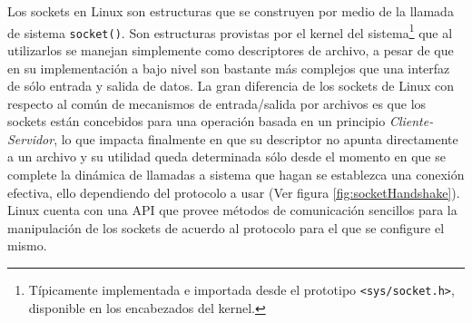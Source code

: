 Los sockets en Linux \cite{rfc:147, book:sockets, paper:socketsGeneral} son estructuras que se construyen por medio de la llamada de sistema \verb=socket()=. Son estructuras provistas por el kernel del sistema\footnote{Típicamente implementada e importada desde el prototipo \verb=<sys/socket.h>=, disponible en los encabezados del kernel.} que al utilizarlos se manejan simplemente como descriptores de archivo, a pesar de que en su implementación a bajo nivel son bastante más complejos que una interfaz de sólo entrada y salida de datos. La gran diferencia de los sockets de Linux con respecto al común de mecanismos de entrada/salida por archivos es que los sockets están concebidos para una operación basada en un principio \emph{Cliente-Servidor}, lo que impacta finalmente en que su descriptor no apunta directamente a un archivo y su utilidad queda determinada sólo desde el momento en que se complete la dinámica de llamadas a sistema que hagan se establezca una conexión efectiva, ello dependiendo del protocolo a usar (Ver figura \ref{fig:socketHandshake}). Linux cuenta con una API que provee métodos de comunicación sencillos para la manipulación de los sockets de acuerdo al protocolo para el que se configure el mismo.

